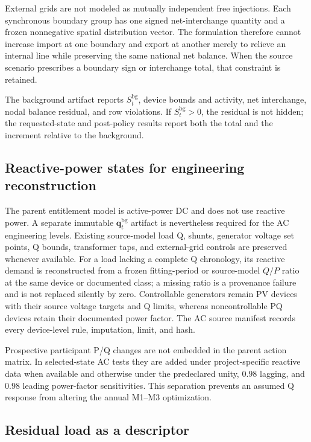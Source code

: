 \documentclass[10pt,journal,onecolumn]{IEEEtran}
\begin{document}
External grids are not modeled as mutually independent free injections. Each
synchronous boundary group has one signed net-interchange quantity and a
frozen nonnegative spatial distribution vector. The formulation therefore
cannot increase import at one boundary and export at another merely to relieve
an internal line while preserving the same national net balance. When the
source scenario prescribes a boundary sign or interchange total, that
constraint is retained.

The background artifact reports $S_t^{\mathrm{bg}}$, device bounds and
activity, net interchange, nodal balance residual, and row violations. If
$S_t^{\mathrm{bg}}>0$, the residual is not hidden; the requested-state and
post-policy results report both the total and the increment relative to the
background.

\subsection{Reactive-power states for engineering reconstruction}

The parent entitlement model is active-power DC and does not use reactive power.
A separate immutable $\bm q_t^{\mathrm{bg}}$ artifact is nevertheless required
for the AC engineering levels. Existing source-model load Q, shunts, generator
voltage set points, Q bounds, transformer taps, and external-grid controls are
preserved whenever available. For a load lacking a complete Q chronology, its
reactive demand is reconstructed from a frozen fitting-period or source-model
$Q/P$ ratio at the same device or documented class; a missing ratio is a
provenance failure and is not replaced silently by zero. Controllable generators
remain PV devices with their source voltage targets and Q limits, whereas
noncontrollable PQ devices retain their documented power factor. The AC source
manifest records every device-level rule, imputation, limit, and hash.

Prospective participant P/Q changes are not embedded in the parent action
matrix. In selected-state AC tests they are added under project-specific
reactive data when available and otherwise under the predeclared unity,
$0.98$ lagging, and $0.98$ leading power-factor sensitivities. This separation
prevents an assumed Q response from altering the annual M1--M3 optimization.

\subsection{Residual load as a descriptor}
\end{document}
